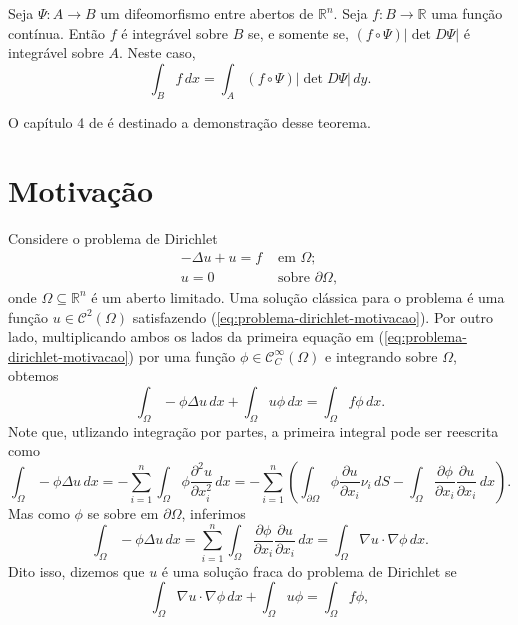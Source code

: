 \documentclass[a4paper, 11pt]{book}
\theoremstyle{definition}
\newcommand{\bR}{\mathbb{R}}
\newcommand{\cC}{\mathcal{C}}
\begin{document}
\begin{tbox}
    Seja $\Psi : A \to B$ um difeomorfismo entre abertos de $\bR^n$. Seja $f : B \to \bR$ uma função contínua. Então $f$ é integrável sobre $B$ se, e somente se, $(f \circ \Psi) |\det D\Psi|$ é integrável sobre $A$. Neste caso,
    \[
        \int_B f \,dx = \int_A (f \circ \Psi) |\det D\Psi| \,dy.
    \]
\end{tbox}
\begin{prf}
    O capítulo 4 de \cite{munkres-analysis.on.manifolds} é destinado a demonstração desse teorema.
\end{prf}

\section{Motivação}
Considere o problema de Dirichlet
\begin{equation} \label{eq:problema-dirichlet-motivacao}
    \begin{aligned}
        -\Delta u + u = f &\text{ em } \Omega;\\
        u = 0 &\text{ sobre } \partial\Omega,
    \end{aligned}
\end{equation}
onde $\Omega \subseteq \bR^n$ é um aberto limitado.
Uma solução clássica para o problema é uma função $u \in \cC^2(\Omega)$ satisfazendo (\ref{eq:problema-dirichlet-motivacao}). 
Por outro lado, multiplicando ambos os lados da primeira equação em (\ref{eq:problema-dirichlet-motivacao}) por uma função $\phi \in \cC^{\infty}_C(\Omega)$ e integrando sobre $\Omega$, obtemos
\[
    \int_\Omega - \phi \Delta u \,dx + \int_\Omega u \phi \,dx = \int_\Omega f \phi \,dx.
\]
Note que, utlizando integração por partes, a primeira integral pode ser reescrita como
\[
    \int_\Omega -\phi \Delta u \,dx = -\sum_{i=1}^n \int_\Omega \phi \frac{\partial^2 u}{\partial x_i^2} \,dx = -\sum_{i=1}^n \left( \int_{\partial\Omega} \phi \frac{\partial u}{\partial x_i} \nu_i \,dS - \int_\Omega \frac{\partial \phi}{\partial x_i} \frac{\partial u}{\partial x_i} \,dx\right).
\]
Mas como $\phi$ se sobre em $\partial \Omega$, inferimos
\[
    \int_\Omega -\phi \Delta u \,dx = \sum_{i=1}^n \int_\Omega \frac{\partial \phi}{\partial x_i} \frac{\partial u}{\partial x_i} \,dx = \int_{\Omega} \nabla u \cdot \nabla \phi \,dx.
\]
Dito isso, dizemos que $u$ é uma solução fraca do problema de Dirichlet se
\begin{equation} \label{eq:sol-fraca-dirichlet}
    \int_{\Omega} \nabla u \cdot \nabla \phi \,dx + \int_\Omega u\phi = \int_\Omega f \phi,
\end{equation}
\end{document}
